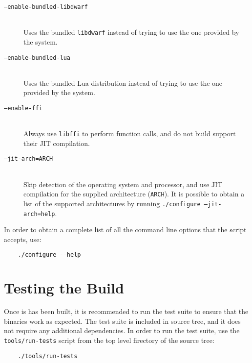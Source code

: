 \begin{description}

	\item [\texttt{--enable-bundled-libdwarf}] \hfill\\
		Uses the bundled \verb|libdwarf| instead of trying to use the one
		provided by the system.

	\item [\texttt{--enable-bundled-lua}] \hfill\\
		Uses the bundled Lua distribution instead of trying to use the one
		provided by the system.

	\item [\texttt{--enable-ffi}] \hfill\\
		Always use \verb|libffi| to perform function calls, and do not build
		support their JIT compilation.

	\item [\texttt{--jit-arch=ARCH}] \hfill\\
		Skip detection of the operating system and processor, and use JIT
		compilation for the supplied architecture (\verb|ARCH|). It is
		possible to obtain a list of the supported architectures by running
		\texttt{./configure --jit-arch=help}.

\end{description}

In order to obtain a complete list of all the command line options that the
script accepts, use:

\begin{verbatim}
	./configure --help
\end{verbatim}


\section{Testing the Build}

Once \Eol* is has been built, it is recommended to run the test suite to
ensure that the binaries work as expected. The test suite is included in
source tree, and it does not require any additional dependencies. In order
to run the test suite, use the \verb|tools/run-tests| script from the
top level firectory of the source tree:

\begin{verbatim}
	./tools/run-tests
\end{verbatim}
